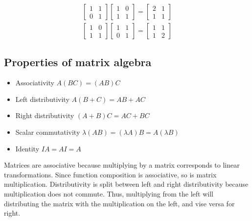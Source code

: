\documentclass{article}
\theoremstyle{mytheoremstyle}
\theoremstyle{mytheoremstyle}
\theoremstyle{myproblemstyle}
\begin{document}
    \begin{align*}
        \begin{bmatrix}
            1 & 1 \\
            0 & 1
        \end{bmatrix}
        \begin{bmatrix}
            1 & 0 \\
            1 & 1
        \end{bmatrix} = 
        \begin{bmatrix}
            2 & 1 \\
            1 & 1
        \end{bmatrix} \\
        \begin{bmatrix}
            1 & 0 \\
            1 & 1
        \end{bmatrix}
        \begin{bmatrix}
            1 & 1 \\
            0 & 1
        \end{bmatrix} = 
        \begin{bmatrix}
            1 & 1 \\
            1 & 2
        \end{bmatrix}
    \end{align*}

    \subsection*{Properties of matrix algebra}
    \begin{itemize}
        \item Associativity $A(BC) = (AB)C$
        \item Left distributivity $A(B+C) = AB+AC$
        \item Right distributivity $(A+B)C = AC+BC$
        \item Scalar commutativity $\lambda(AB) = (\lambda A)B = A(\lambda B)$
        \item Identity $IA = AI = A$
    \end{itemize}
    Matrices are associative because multiplying by a matrix corresponds to
    linear transformations. Since function composition is associative, so is
    matrix multiplication. Distributivity is split between left and right
    distributivity because multiplication does not commute. Thus, multiplying
    from the left will distributing the matrix with the multiplication on the
    left, and vise versa for right.
\end{document}
